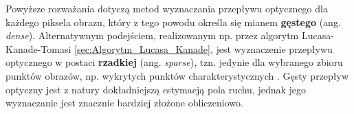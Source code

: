 Powyższe rozważania dotyczą metod wyznaczania przepływu optycznego dla każdego piksela obrazu, który z tego powodu określa się mianem \textbf{gęstego} (ang. \textit{dense}). Alternatywnym podejściem, realizowanym np. przez algorytm Lucasa-Kanade-Tomasi \ref{sec:Algorytm_Lucasa_Kanade}, jest wyznaczenie przepływu optycznego w postaci \textbf{rzadkiej} (ang. \textit{sparse}), tzn. jedynie dla wybranego zbioru punktów obrazów, np. wykrytych punktów charakterystycznych \cite{Karasulu2013}. Gęsty przepływ optyczny jest z natury dokładniejszą estymacją pola ruchu, jednak jego wyznaczanie jest znacznie bardziej złożone obliczeniowo. 